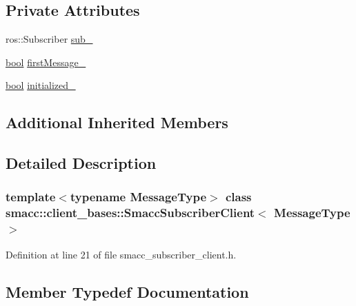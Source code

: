 \subsection*{Private Attributes}
\begin{DoxyCompactItemize}
\item 
ros\+::\+Subscriber \hyperlink{classsmacc_1_1client__bases_1_1SmaccSubscriberClient_a0f69a1b0a284ae47f5d717c6ab95f089}{sub\+\_\+}
\item 
\hyperlink{classbool}{bool} \hyperlink{classsmacc_1_1client__bases_1_1SmaccSubscriberClient_a1283e89a0d33a9028a5042519c6869a6}{first\+Message\+\_\+}
\item 
\hyperlink{classbool}{bool} \hyperlink{classsmacc_1_1client__bases_1_1SmaccSubscriberClient_a2096c76f6464d0a513625cc53dba51ed}{initialized\+\_\+}
\end{DoxyCompactItemize}
\subsection*{Additional Inherited Members}


\subsection{Detailed Description}
\subsubsection*{template$<$typename Message\+Type$>$\newline
class smacc\+::client\+\_\+bases\+::\+Smacc\+Subscriber\+Client$<$ Message\+Type $>$}



Definition at line 21 of file smacc\+\_\+subscriber\+\_\+client.\+h.



\subsection{Member Typedef Documentation}
\mbox{\label{classsmacc_1_1client__bases_1_1SmaccSubscriberClient_a61d798bda71bf335d72e61928ca561b0}} 
